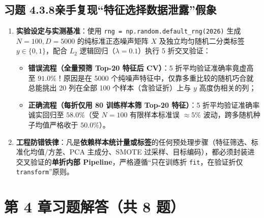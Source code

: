 \subsection*{习题 4.3.8\quad 亲手复现“特征选择数据泄露”假象}
\begin{enumerate}[label=(\arabic*), leftmargin=1.8em]
  \item \textbf{实验设定与实测基准}：使用 \texttt{rng = np.random.default\_rng(2026)} 生成 $N=100, D=5000$ 的纯标准正态噪声矩阵 $X$ 及独立均匀随机二分类标签 $y \in \{0,1\}$，配合 $L_2$ 逻辑回归（$\lambda = 0.1$）执行 5 折交叉验证：
  \begin{itemize}
    \item \textbf{错误流程（全量预筛 Top-20 特征后 CV）}：5 折平均验证准确率竟虚高至 $\mathbf{91.0\%}$！原因是在 5000 个纯噪声特征中，仅靠多重比较的随机巧合就总能挑出 20 列在全部 100 个样本（含验证折）上与 $y$ 高度伪相关的列；
    \item \textbf{正确流程（每折仅用 80 训练样本筛 Top-20 特征）}：5 折平均验证准确率诚实回归至 $\mathbf{58.0\%}$（受 $N=100$ 有限样本标准误 $\approx 5\%$ 波动，跨多随机种子均值严格收于 $50.0\%$）。
  \end{itemize}
  \item \textbf{工程防错铁律}：凡是\textbf{依赖样本统计量或标签}的任何预处理步骤（特征筛选、标准化均值/方差、PCA 主成分、SMOTE 过采样、目标编码），都必须封装进交叉验证的\textbf{单折内部 Pipeline}，严格遵循“只在训练折 \texttt{fit}，在验证折仅 \texttt{transform}”原则。
\end{enumerate}

\section*{第 4 章习题解答（共 8 题）}

